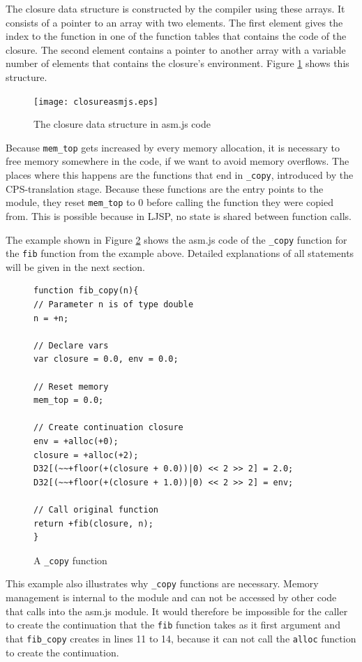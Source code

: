 \documentclass[11pt]{report}
\begin{document}
The closure data structure is constructed by the compiler using these arrays. It consists of a pointer to an array with two elements. The first element gives the index to the function in one of the function tables that contains the code of the closure. The second element contains a pointer to another array with a variable number of elements that contains the closure's environment. Figure \ref{asmjsclosure} shows this structure.

\begin{figure}[ht]
\begin{center}
\texttt{[image: closureasmjs.eps]}
\end{center}
\caption{The closure data structure in asm.js code}
\label{asmjsclosure}
\end{figure}


Because \texttt{mem_top} gets increased by every memory allocation, it is necessary to free memory somewhere in the code, if we want to avoid memory overflows. The places where this happens are the functions that end in \texttt{_copy}, introduced by the CPS-translation stage. Because these functions are the entry points to the module, they reset \texttt{mem_top} to $0$ before calling the function they were copied from. This is possible because in LJSP, no state is shared between function calls.

The example shown in Figure \ref{iasmjsmm4} shows the asm.js code of the \texttt{_copy} function for the \texttt{fib} function from the example above. Detailed explanations of all statements will be given in the next section.

\begin{figure}[ht]
\begin{lstlisting}
function fib_copy(n){
// Parameter n is of type double
n = +n;

// Declare vars
var closure = 0.0, env = 0.0;

// Reset memory
mem_top = 0.0;

// Create continuation closure
env = +alloc(+0);
closure = +alloc(+2);
D32[(~~+floor(+(closure + 0.0))|0) << 2 >> 2] = 2.0;
D32[(~~+floor(+(closure + 1.0))|0) << 2 >> 2] = env;

// Call original function
return +fib(closure, n);
}
\end{lstlisting}
\caption{A \texttt{_copy} function}
\label{iasmjsmm4}
\end{figure}

This example also illustrates why \texttt{_copy} functions are necessary. Memory management is internal to the module and can not be accessed by other code that calls into the asm.js module. It would therefore be impossible for the caller to create the continuation that the \texttt{fib} function takes as it first argument and that \texttt{fib_copy} creates in lines 11 to 14, because it can not call the \texttt{alloc} function to create the continuation.
\end{document}
